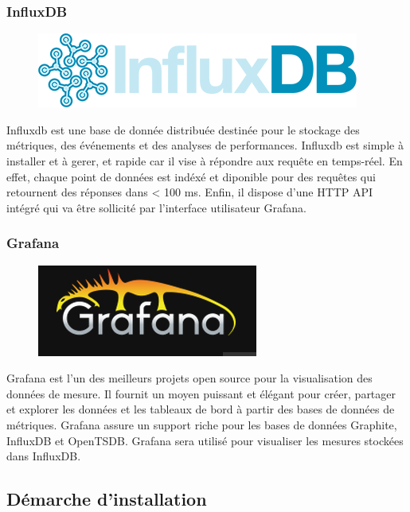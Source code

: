 \begin{onehalfspace}
\subsubsection*{InfluxDB}

\begin{figure}
\centering
\includegraphics[scale=0.2]{chapitre5/assets/influxdb}
\end{figure}
\noindent Influxdb est une base de donnée distribuée destinée pour le stockage des métriques, des événements et des analyses de performances. Influxdb est simple à installer et à gerer, et rapide car il vise à répondre aux requête en temps-réel. En effet, chaque point de données est indéxé et diponible pour des requêtes qui retournent des réponses dans < 100 ms. Enfin, il dispose d'une HTTP API intégré qui va être sollicité par l'interface utilisateur Grafana.

\subsubsection*{Grafana}

\begin{figure}
\centering
\includegraphics[scale=0.3]{chapitre5/assets/grafana}
\end{figure}
\noindent Grafana est l'un des meilleurs projets open source pour la visualisation des données de mesure. Il fournit un moyen puissant et élégant pour créer, partager et explorer les données et les tableaux de bord à partir des bases de données de métriques. Grafana assure un support riche pour les bases de données Graphite, InfluxDB et OpenTSDB. Grafana sera utilisé pour visualiser les mesures stockées dans InfluxDB.


\subsection{Démarche d'installation}


\end{onehalfspace}
